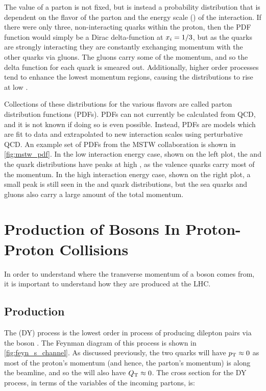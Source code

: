 The  value of a parton is not fixed, but is instead a probability
distribution that is dependent on the flavor of the parton and the energy scale
(\InteractionEnergy) of the interaction. If there were only three,
non-interacting quarks within the proton, then the PDF function would simply be
a Dirac delta-function at $x_{i} = 1/3$, but as the quarks are strongly
interacting they are constantly exchanging momentum with the other quarks via
gluons. The gluons carry some of the momentum, and so the delta function for
each quark is smeared out. Additionally, higher order processes tend to enhance
the lowest momentum regions, causing the distributions to rise at low
.

Collections of these distributions for the various flavors are called parton
distribution functions (PDFs). PDFs can not currently be calculated from QCD,
and it is not known if doing so is even possible. Instead, PDFs are models
which are fit to data and extrapolated to new interaction scales using
perturbative QCD. An example set of PDFs from the MSTW
collaboration\cite{martin_2009} is shown in \cref{fig:mstw_pdf}. In the low
interaction energy case, shown on the left plot, the \upquark and the
\downquark quark distributions have peaks at high , as the valence
quarks carry most of the momentum. In the high interaction energy case, shown
on the right plot, a small peak is still seen in the \upquark and \downquark
quark distributions, but the sea quarks and gluons also carry a large amount of
the total momentum.



\section{Production of \texorpdfstring{\Z}{Z} Bosons In Proton-Proton Collisions}
\label{sec:z_production}

In order to understand where the transverse momentum of a \Z boson comes from,
it is important to understand how they are produced at the LHC.

\subsection{\DrellYan Production}
\label{ssec:dy_production}

The \DrellYan (DY) process is the lowest order in \alphastrong process of
producing dilepton pairs via the \Z boson \cite{drell_1970,drell_1970a}. The
Feynman diagram of this process is shown in \cref{fig:feyn_s_channel}. As
discussed previously, the two quarks will have $p_{\mathrm{T}} \approx 0$ as most of the
proton's momentum (and hence, the parton's momentum) is along the beamline, and
so the \Z will also have $Q_{\mathrm{T}} \approx 0$. The cross section for the DY
process, in terms of the  variables of the incoming partons, is:

